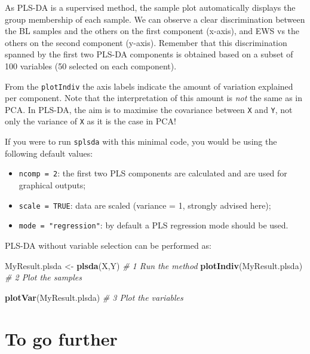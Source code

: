 \documentclass[]{book}
\newenvironment{Shaded}{\begin{snugshade}}{\end{snugshade}}
\newcommand{\KeywordTok}[1]{\textcolor[rgb]{0.13,0.29,0.53}{\textbf{#1}}}
\newcommand{\StringTok}[1]{\textcolor[rgb]{0.31,0.60,0.02}{#1}}
\newcommand{\CommentTok}[1]{\textcolor[rgb]{0.56,0.35,0.01}{\textit{#1}}}
\newcommand{\NormalTok}[1]{#1}
\providecommand{\tightlist}{%
  \setlength{\itemsep}{0pt}\setlength{\parskip}{0pt}}
\theoremstyle{definition}
\theoremstyle{definition}
\theoremstyle{definition}
\theoremstyle{remark}
\begin{document}
As PLS-DA is a supervised method, the sample plot automatically displays
the group membership of each sample. We can observe a clear
discrimination between the BL samples and the others on the first
component (x-axis), and EWS vs the others on the second component
(y-axis). Remember that this discrimination spanned by the first two
PLS-DA components is obtained based on a subset of 100 variables (50
selected on each component).

From the \texttt{plotIndiv} the axis labels indicate the amount of
variation explained per component. Note that the interpretation of this
amount is \emph{not} the same as in PCA. In PLS-DA, the aim is to
maximise the covariance between \texttt{X} and \texttt{Y}, not only the
variance of \texttt{X} as it is the case in PCA!

If you were to run \texttt{splsda} with this minimal code, you would be
using the following default values:

\begin{itemize}
\tightlist
\item
  \texttt{ncomp\ =\ 2}: the first two PLS components are calculated and
  are used for graphical outputs;
\item
  \texttt{scale\ =\ TRUE}: data are scaled (variance = 1, strongly
  advised here);
\item
  \texttt{mode\ =\ "regression"}: by default a PLS regression mode
  should be used.
\end{itemize}

PLS-DA without variable selection can be performed as:

\begin{Shaded}
\begin{Highlighting}[]
\NormalTok{MyResult.plsda <-}\StringTok{ }\KeywordTok{plsda}\NormalTok{(X,Y) }\CommentTok{# 1 Run the method}
\KeywordTok{plotIndiv}\NormalTok{(MyResult.plsda)    }\CommentTok{# 2 Plot the samples}
\end{Highlighting}
\end{Shaded}

\begin{Shaded}
\begin{Highlighting}[]
\KeywordTok{plotVar}\NormalTok{(MyResult.plsda)      }\CommentTok{# 3 Plot the variables}
\end{Highlighting}
\end{Shaded}

\section{To go further}\label{plsda-tgf}
\end{document}
